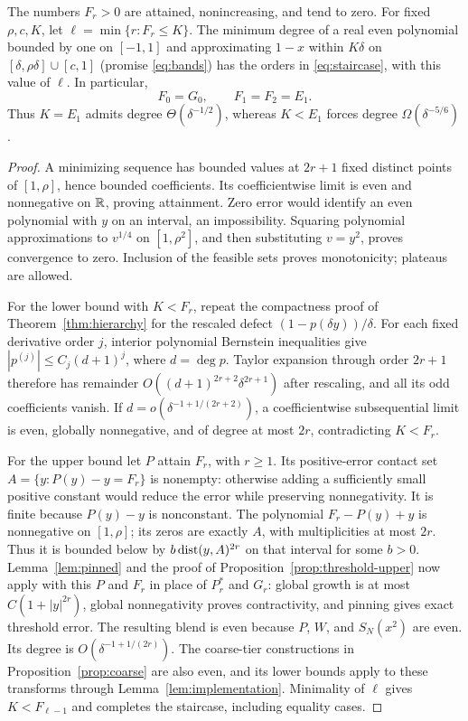 \begin{theorem}\label{thm:even-staircase}
The numbers $F_r>0$ are attained, nonincreasing, and tend to zero. For fixed $\rho,c,K$, let $\ell=\min\{r:F_r\leq K\}$. The minimum degree of a real even polynomial bounded by one on $[-1,1]$ and approximating $1-x$ within $K\delta$ on $[\delta,\rho\delta]\cup[c,1]$ (promise \eqref{eq:bands}) has the orders in \eqref{eq:staircase}, with this value of $\ell$. In particular,
\begin{equation}\label{eq:even-plateau}
 F_0=G_0,\qquad F_1=F_2=E_1.
\end{equation}
Thus $K=E_1$ admits degree $\Theta(\delta^{-1/2})$, whereas $K<E_1$ forces degree $\Omega(\delta^{-5/6})$.
\end{theorem}
\begin{proof}
A minimizing sequence has bounded values at $2r+1$ fixed distinct points of $[1,\rho]$, hence bounded coefficients. Its coefficientwise limit is even and nonnegative on $\mathbb R$, proving attainment. Zero error would identify an even polynomial with $y$ on an interval, an impossibility. Squaring polynomial approximations to $v^{1/4}$ on $[1,\rho^2]$, and then substituting $v=y^2$, proves convergence to zero. Inclusion of the feasible sets proves monotonicity; plateaus are allowed.

For the lower bound with $K<F_r$, repeat the compactness proof of Theorem~\ref{thm:hierarchy} for the rescaled defect $(1-p(\delta y))/\delta$. For each fixed derivative order $j$, interior polynomial Bernstein inequalities give $|p^{(j)}|\leq C_j(d+1)^j$, where $d=\deg p$. Taylor expansion through order $2r+1$ therefore has remainder $O((d+1)^{2r+2}\delta^{2r+1})$ after rescaling, and all its odd coefficients vanish. If $d=o(\delta^{-1+1/(2r+2)})$, a coefficientwise subsequential limit is even, globally nonnegative, and of degree at most $2r$, contradicting $K<F_r$.

For the upper bound let $P$ attain $F_r$, with $r\geq1$. Its positive-error contact set $A=\{y:P(y)-y=F_r\}$ is nonempty: otherwise adding a sufficiently small positive constant would reduce the error while preserving nonnegativity. It is finite because $P(y)-y$ is nonconstant. The polynomial $F_r-P(y)+y$ is nonnegative on $[1,\rho]$; its zeros are exactly $A$, with multiplicities at most $2r$. Thus it is bounded below by $b\operatorname{dist}(y,A)^{2r}$ on that interval for some $b>0$. Lemma~\ref{lem:pinned} and the proof of Proposition~\ref{prop:threshold-upper} now apply with this $P$ and $F_r$ in place of $P_r^*$ and $G_r$: global growth is at most $C(1+|y|^{2r})$, global nonnegativity proves contractivity, and pinning gives exact threshold error. The resulting blend is even because $P$, $W$, and $S_N(x^2)$ are even. Its degree is $O(\delta^{-1+1/(2r)})$. The coarse-tier constructions in Proposition~\ref{prop:coarse} are also even, and its lower bounds apply to these transforms through Lemma~\ref{lem:implementation}. Minimality of $\ell$ gives $K<F_{\ell-1}$ and completes the staircase, including equality cases.


\end{proof}

